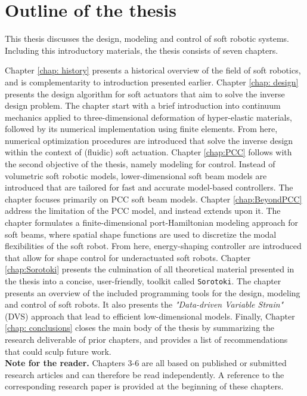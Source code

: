 \section{Outline of the thesis}
\label{sec:intro:outline}
This thesis discusses the design, modeling and control of soft robotic systems. Including this introductory materials, the thesis consists of seven chapters. 

Chapter \ref{chap: history} presents a historical overview of the field of soft robotics, and is complementarity to introduction presented earlier. Chapter \ref{chap: design} presents the design algorithm for soft actuators that aim to solve the inverse design problem. The chapter start with a brief introduction into continuum mechanics applied to three-dimensional deformation of hyper-elastic materials, followed by its numerical implementation using finite elements. From here, numerical optimization procedures are introduced that solve the inverse design within the context of (fluidic) soft actuation. Chapter \ref{chap:PCC} follows with the second objective of the thesis, namely modeling for control. Instead of volumetric soft robotic models, lower-dimensional soft beam models are introduced that are tailored for fast and accurate model-based controllers. The chapter focuses primarily on PCC soft beam models. Chapter \ref{chap:BeyondPCC} address the limitation of the PCC model, and instead extends upon it. The chapter formulates a finite-dimensional port-Hamiltonian modeling approach for soft beams, where spatial shape functions are used to discretize the modal flexibilities of the soft robot. From here, energy-shaping controller are introduced that allow for shape control for underactuated soft robots. Chapter \ref{chap:Sorotoki} presents the culmination of all theoretical material presented in the thesis into a concise, user-friendly, toolkit called \texttt{Sorotoki}. The chapter presents an overview of the included programming tools for the design, modeling and control of soft robots. It also presents the \textit{"Data-driven Variable Strain"} (DVS) approach that lead to efficient low-dimensional models. Finally, Chapter \ref{chap: conclusions} closes the main body of the thesis by summarizing the research deliverable of prior chapters, and provides a list of recommendations that could sculp future work.
\\

\textbf{Note for the reader.} Chapters 3-6 are all based on published or submitted research articles and can therefore be read independently. A reference to the corresponding research paper is provided at the beginning of these chapters. 

